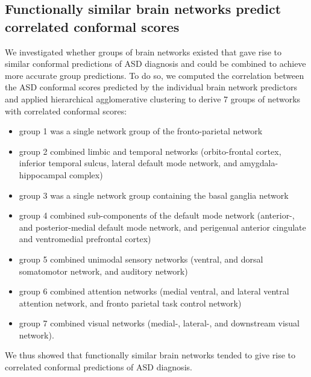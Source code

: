 \documentclass[9pt,lineno]{elife}
\begin{document}
\subsection{Functionally similar brain networks predict correlated conformal scores}
We investigated whether groups of brain networks existed that gave rise to similar conformal predictions of ASD diagnosis and could be combined to achieve more accurate group predictions. To do so, we computed the correlation between the ASD conformal scores predicted by the individual brain network predictors and applied hierarchical agglomerative clustering to derive 7 groups of networks with correlated conformal scores: 
\begin{itemize}
    \item group 1 was a single network group of the fronto-parietal network
    \item group 2 combined limbic and temporal networks (orbito-frontal cortex, inferior temporal sulcus, lateral default mode network, and amygdala-hippocampal complex)
    \item group 3 was a single network group containing the basal ganglia network
    \item group 4 combined sub-components of the default mode network (anterior-, and posterior-medial default mode network, and perigenual anterior cingulate and ventromedial prefrontal cortex)
    \item group 5 combined unimodal sensory networks (ventral, and dorsal somatomotor network, and auditory network)
    \item group 6 combined attention networks (medial ventral, and lateral ventral attention network, and fronto parietal task control network)
    \item group 7 combined visual networks (medial-, lateral-, and downstream visual network). 
\end{itemize}
We thus showed that functionally similar brain networks tended to give rise to correlated conformal predictions of ASD diagnosis.
\end{document}
